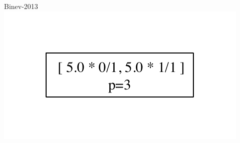 \documentclass{beamer}
\begin{document}
\begin{frame}{Binev-2013}
{  \includegraphics[height=0.5\textheight]{tree_hp_2.pdf}}

\end{frame}
\end{document}
